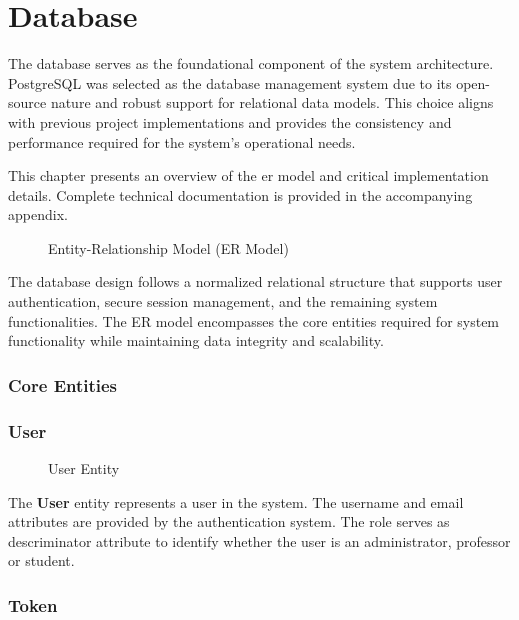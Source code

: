 \chapter{Database} \label{cap:database}
The database serves as the foundational component of the system architecture. PostgreSQL was selected as the database management system due to its open-source nature and robust support for relational data models. This choice aligns with previous project implementations and provides the consistency and performance required for the system's operational needs.

This chapter presents an overview of the \ac{er model} and critical implementation details. Complete technical documentation is provided in the accompanying appendix.

\begin{figure}[H]
    \centering
    
    \caption{Entity-Relationship Model (ER Model)}
    \label{fig:er_model}
\end{figure}

The database design follows a normalized relational structure that supports user authentication, secure session management, and the remaining system functionalities. The ER model encompasses the core entities required for system functionality while maintaining data integrity and scalability.

\subsection*{Core Entities}
\subsection*{User}

\begin{figure}[H]
    \centering
    
    \caption{User Entity}
    \label{fig:user_entity}
\end{figure}

The \textbf{User} entity represents a user in the system. The username and email attributes are provided by the authentication system. The role serves as descriminator attribute to identify whether the user is an administrator, professor or student.

\subsection*{Token}

